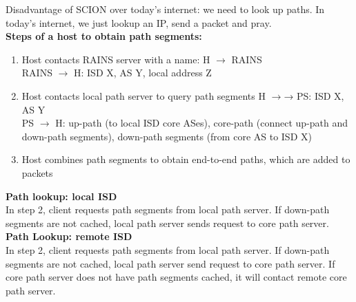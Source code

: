 \documentclass[11pt,oneside,a4paper]{article}
\begin{document}
Disadvantage of SCION over today's internet: we need to look up paths. In today's internet, we just lookup an IP, send a packet and pray.\\

\noindent \textbf{Steps of a host to obtain path segments:}

\vspace{-\topsep}
\begin{enumerate}
	\setlength{\itemsep}{0pt}
	\setlength{\parskip}{0pt}
	\item Host contacts RAINS server with a name: H $\rightarrow$ RAINS\\
	RAINS $\rightarrow$ H: ISD X, AS Y, local address Z
	\item Host contacts local path server to query path segments H $\rightarrow$→ PS: ISD X, AS Y\\
	PS $\rightarrow$ H: up-path (to local ISD core ASes), core-path (connect up-path and down-path
	segments), down-path segments (from core AS to ISD X)
	\item Host combines path segments to obtain end-to-end 	paths, which are added to packets\\
\end{enumerate}
\vspace{-\topsep}

\newpage

\noindent \textbf{Path lookup: local ISD}\\
In step 2, client requests path segments from local path server. If down-path segments are not cached, local path server sends request to core path server.\\

\noindent \textbf{Path Lookup: remote ISD}\\
In step 2, client requests path segments from local path server. If down-path segments are not cached, local path server send request to core path server. If core path server does not have path segments cached, it will contact remote core path server.
\end{document}
